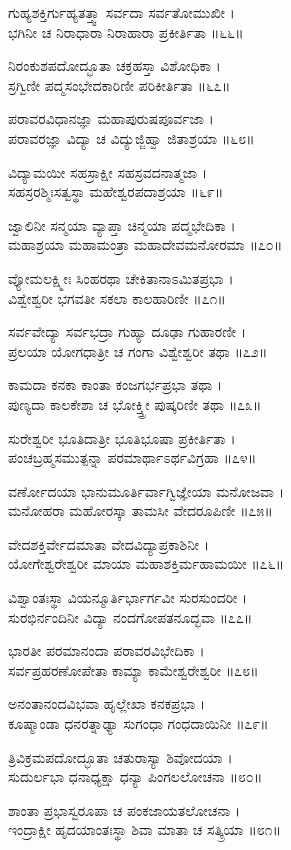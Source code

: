 ಗುಹ್ಯಶಕ್ತಿರ್ಗುಹ್ಯತತ್ತ್ವಾ ಸರ್ವದಾ ಸರ್ವತೋಮುಖೀ ।\\
ಭಗಿನೀ ಚ ನಿರಾಧಾರಾ ನಿರಾಹಾರಾ ಪ್ರಕೀರ್ತಿತಾ ॥೬೬॥

ನಿರಂಕುಶಪದೋದ್ಭೂತಾ ಚಕ್ರಹಸ್ತಾ ವಿಶೋಧಿಕಾ ।\\
ಸ್ರಗ್ವಿಣೀ ಪದ್ಮಸಂಭೇದಕಾರಿಣೀ ಪರಿಕೀರ್ತಿತಾ ॥೬೭॥

ಪರಾವರವಿಧಾನಜ್ಞಾ ಮಹಾಪುರುಷಪೂರ್ವಜಾ ।\\
ಪರಾವರಜ್ಞಾ ವಿದ್ಯಾ ಚ ವಿದ್ಯುಜ್ಜಿಹ್ವಾ ಜಿತಾಶ್ರಯಾ ॥೬೮॥

ವಿದ್ಯಾಮಯೀ ಸಹಸ್ರಾಕ್ಷೀ ಸಹಸ್ರವದನಾತ್ಮಜಾ ।\\
ಸಹಸ್ರರಶ್ಮಿಃಸತ್ವಸ್ಥಾ ಮಹೇಶ್ವರಪದಾಶ್ರಯಾ ॥೬೯॥

ಜ್ವಾಲಿನೀ ಸನ್ಮಯಾ ವ್ಯಾಪ್ತಾ ಚಿನ್ಮಯಾ ಪದ್ಮಭೇದಿಕಾ ।\\
ಮಹಾಶ್ರಯಾ ಮಹಾಮಂತ್ರಾ ಮಹಾದೇವಮನೋರಮಾ ॥೭೦॥

ವ್ಯೋಮಲಕ್ಷ್ಮೀಃ ಸಿಂಹರಥಾ ಚೇಕಿತಾನಾಽಮಿತಪ್ರಭಾ ।\\
ವಿಶ್ವೇಶ್ವರೀ ಭಗವತೀ ಸಕಲಾ ಕಾಲಹಾರಿಣೀ ॥೭೧॥

ಸರ್ವವೇದ್ಯಾ ಸರ್ವಭದ್ರಾ ಗುಹ್ಯಾ ದೂಢಾ ಗುಹಾರಣೀ ।\\
ಪ್ರಲಯಾ ಯೋಗಧಾತ್ರೀ ಚ ಗಂಗಾ ವಿಶ್ವೇಶ್ವರೀ ತಥಾ ॥೭೨॥

ಕಾಮದಾ ಕನಕಾ ಕಾಂತಾ ಕಂಜಗರ್ಭಪ್ರಭಾ ತಥಾ ।\\
ಪುಣ್ಯದಾ ಕಾಲಕೇಶಾ ಚ ಭೋಕ್ತ್ತ್ರೀ ಪುಷ್ಕರಿಣೀ ತಥಾ ॥೭೩॥

ಸುರೇಶ್ವರೀ ಭೂತಿದಾತ್ರೀ ಭೂತಿಭೂಷಾ ಪ್ರಕೀರ್ತಿತಾ ।\\
ಪಂಚಬ್ರಹ್ಮಸಮುತ್ಪನ್ನಾ ಪರಮಾರ್ಥಾಽರ್ಥವಿಗ್ರಹಾ ॥೭೪॥

ವರ್ಣೋದಯಾ ಭಾನುಮೂರ್ತಿರ್ವಾಗ್ವಿಜ್ಞೇಯಾ ಮನೋಜವಾ ।\\
ಮನೋಹರಾ ಮಹೋರಸ್ಕಾ ತಾಮಸೀ ವೇದರೂಪಿಣೀ ॥೭೫॥

ವೇದಶಕ್ತಿರ್ವೇದಮಾತಾ ವೇದವಿದ್ಯಾಪ್ರಕಾಶಿನೀ ।\\
ಯೋಗೇಶ್ವರೇಶ್ವರೀ ಮಾಯಾ ಮಹಾಶಕ್ತಿರ್ಮಹಾಮಯೀ ॥೭೬॥

ವಿಶ್ವಾಂತಃಸ್ಥಾ ವಿಯನ್ಮೂರ್ತಿರ್ಭಾರ್ಗವೀ ಸುರಸುಂದರೀ ।\\
ಸುರಭಿರ್ನಂದಿನೀ ವಿದ್ಯಾ ನಂದಗೋಪತನೂದ್ಭವಾ ॥೭೭॥

ಭಾರತೀ ಪರಮಾನಂದಾ ಪರಾವರವಿಭೇದಿಕಾ ।\\
ಸರ್ವಪ್ರಹರಣೋಪೇತಾ ಕಾಮ್ಯಾ ಕಾಮೇಶ್ವರೇಶ್ವರೀ ॥೭೮॥

ಅನಂತಾನಂದವಿಭವಾ ಹೃಲ್ಲೇಖಾ ಕನಕಪ್ರಭಾ ।\\
ಕೂಷ್ಮಾಂಡಾ ಧನರತ್ನಾಢ್ಯಾ ಸುಗಂಧಾ ಗಂಧದಾಯಿನೀ ॥೭೯॥

ತ್ರಿವಿಕ್ರಮಪದೋದ್ಭೂತಾ ಚತುರಾಸ್ಯಾ ಶಿವೋದಯಾ ।\\
ಸುದುರ್ಲಭಾ ಧನಾಧ್ಯಕ್ಷಾ ಧನ್ಯಾ ಪಿಂಗಲಲೋಚನಾ ॥೮೦॥

ಶಾಂತಾ ಪ್ರಭಾಸ್ವರೂಪಾ ಚ ಪಂಕಜಾಯತಲೋಚನಾ ।\\
ಇಂದ್ರಾಕ್ಷೀ ಹೃದಯಾಂತಃಸ್ಥಾ ಶಿವಾ ಮಾತಾ ಚ ಸತ್ಕ್ರಿಯಾ ॥೮೧॥


